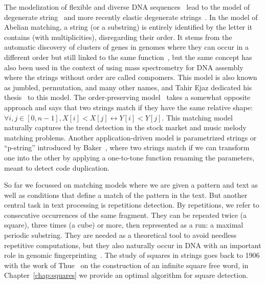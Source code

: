The modelization of flexible and diverse DNA sequences~\cite{comm1970iupac} lead to the model of degenerate string~\cite{abrahamson1987generalized} and more recently elastic degenerate strings~\cite{iliopoulos2021efficient}.
In the model of Abelian matching, a string (or a substring) is entirely identified by the letter it contains (with multiplicities), disregarding their order. It stems from the automatic discovery of clusters of genes in genomes where they can occur in a different order but still linked to the same function~\cite{eres2004permutation}, but the same concept has also been used in the context  of using mass spectrometry for DNA assembly~\cite{bocker2003sequencing} where the strings without order are called compomers. This model is also known as jumbled, permutation, and many other names, and Tahir Ejaz dedicated his thesis~\cite{ejaz2010abelian} to this model.
The order-preserving model~\cite{kim2014order,kubica2013linear} takes a somewhat opposite approach and says that two strings match if they have the same relative shape: $\forall i,j \in [0,n-1], X[i] < X[j] \leftrightarrow Y[i] < Y[j]$. This matching model naturally captures the trend detection in the stock market and music melody matching problems.
%
Another application-driven model is parametrized strings or ``p-string'' introduced by Baker~\cite{baker1993theory}, where two strings match if we can transform one into the other by applying a one-to-tone function renaming the parameters, meant to detect code duplication.

So far we focussed on matching models where we are given a pattern and text as well as conditions that define a match of the pattern in the text. But another central task in text processing is repetitions detection. By repetitions, we refer to consecutive occurrences of the same fragment. They can be repeated twice (a square), three times (a cube) or more, then represented as a run: a maximal periodic substring. They are needed as a theoretical tool to avoid needless repetitive computations, but they also naturally occur in DNA with an important role in genomic fingerprinting~\cite{Kolpakov2003}.
The study of squares in strings goes back to 1906 with the work of Thue~\cite{thue1906} on the construction of an infinite square free word, in Chapter~\ref{chap:squares} we provide an optimal algorithm for square detection.

